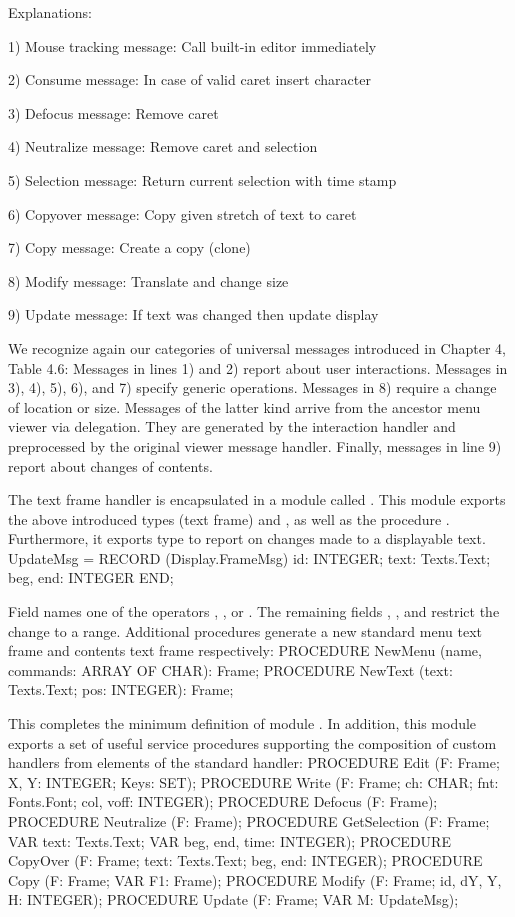 Explanations:

1) Mouse tracking message: Call built-in editor immediately

2) Consume message: In case of valid caret insert character

3) Defocus message: Remove caret

4) Neutralize message: Remove caret and selection

5) Selection message: Return current selection with time stamp

6) Copyover message: Copy given stretch of text to caret

7) Copy message: Create a copy (clone)

8) Modify message: Translate and change size

9) Update message: If text was changed then update display

We recognize again our categories of universal messages introduced in Chapter 4, Table 4.6: Messages in lines 1) and 2) report about user interactions. Messages in 3), 4), 5), 6), and 7) specify generic operations. Messages in 8) require a change of location or size. Messages of the latter kind arrive from the ancestor menu viewer via delegation. They are generated by the interaction handler and preprocessed by the original viewer message handler. Finally, messages in line 9) report about changes of contents.

The text frame handler is encapsulated in a module called . This module exports the above introduced types  (text frame) and , as well as the procedure . Furthermore, it exports type  to report on changes made to a displayable text.
\begintt
UpdateMsg = RECORD (Display.FrameMsg)
  id: INTEGER;
  text: Texts.Text;
  beg, end: INTEGER
END;
\endtt

\noindent Field  names one of the operators , , or . The remaining fields , , and  restrict the change to a range. Additional procedures generate a new standard menu text frame and contents text frame respectively:
\begintt
PROCEDURE NewMenu (name, commands: ARRAY OF CHAR): Frame;
PROCEDURE NewText (text: Texts.Text; pos: INTEGER): Frame;
\endtt

\noindent This completes the minimum definition of module . In addition, this module exports a set of useful service procedures supporting the composition of custom handlers from elements of the standard handler:
\begintt
PROCEDURE Edit (F: Frame; X, Y: INTEGER; Keys: SET);
PROCEDURE Write (F: Frame; ch: CHAR; fnt: Fonts.Font; col, voff: INTEGER);
PROCEDURE Defocus (F: Frame);
PROCEDURE Neutralize (F: Frame);
PROCEDURE GetSelection (F: Frame; VAR text: Texts.Text;
                        VAR beg, end, time: INTEGER);
PROCEDURE CopyOver (F: Frame; text: Texts.Text; beg, end: INTEGER);
PROCEDURE Copy (F: Frame; VAR F1: Frame);
PROCEDURE Modify (F: Frame; id, dY, Y, H: INTEGER);
PROCEDURE Update (F: Frame; VAR M: UpdateMsg);
\endtt

